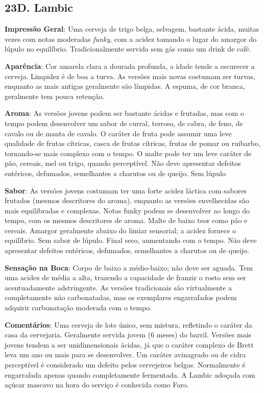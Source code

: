 \subsection*{23D. Lambic}
\textbf{Impressão Geral}: Uma cerveja de trigo belga, selvagem, bastante ácida, muitas vezes com notas moderadas \textit{funky}, com a acidez tomando o lugar do amargor do lúpulo no equilíbrio. Tradicionalmente servida sem gás como um drink de café.

\textbf{Aparência}: Cor amarela clara a dourada profunda, a idade tende a escurecer a cerveja. Limpidez é de boa a turva. As versões mais novas costumam ser turvas, enquanto as mais antigas geralmente são límpidas. A espuma, de cor branca, geralmente tem pouca retenção.

\textbf{Aroma}: As versões jovens podem ser bastante ácidas e frutadas, mas com o tempo podem desenvolver um sabor de curral, terroso, de cabra, de feno, de cavalo ou de manta de cavalo. O caráter de fruta pode assumir uma leve qualidade de frutas cítricas, casca de frutas cítricas, frutas de pomar ou ruibarbo, tornando-se mais complexo com o tempo. O malte pode ter um leve caráter de pão, cereais, mel ou trigo, quando perceptível. Não deve apresentar defeitos entéricos, defumados, semelhantes a charutos ou de queijo. Sem lúpulo

\textbf{Sabor}: As versões jovens costumam ter uma forte acidez láctica com sabores frutados (mesmos descritores do aroma), enquanto as versões envelhecidas são mais equilibradas e complexas. Notas funky podem se desenvolver ao longo do tempo, com os mesmos descritores de aroma. Malte de baixo teor como pão e cereais. Amargor geralmente abaixo do limiar sensorial; a acidez fornece o equilíbrio. Sem sabor de lúpulo. Final seco, aumentando com o tempo. Não deve apresentar defeitos entéricos, defumados, semelhantes a charutos ou de queijo.

\textbf{Sensação na Boca}: Corpo de baixo a médio-baixo; não deve ser aguada. Tem uma acidez de média a alta, trazendo a capacidade de franzir o rosto sem ser acentuadamente adstringente. As versões tradicionais são virtualmente a completamente não carbonatadas, mas os exemplares engarrafados podem adquirir carbonatação moderada com o tempo.

\textbf{Comentários}: Uma cerveja de lote único, sem mistura, refletindo o caráter da casa da cervejaria. Geralmente servida jovem (6 meses) do barril. Versões mais jovens tendem a ser unidimensionais ácidas, já que o caráter complexo de Brett leva um ano ou mais para se desenvolver. Um caráter avinagrado ou de cidra perceptível é considerado um defeito pelos cervejeiros belgas. Normalmente é engarrafada apenas quando completamente fermentada. A Lambic adoçada com açúcar mascavo na hora do serviço é conhecida como Faro.


